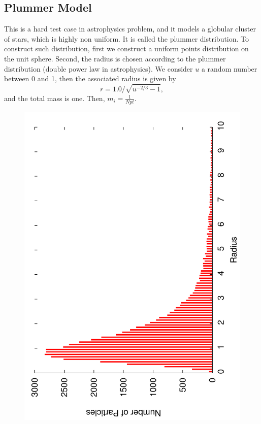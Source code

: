 \documentclass[10pt]{article}
\begin{document}
\subsection{Plummer Model}
This is a hard test case in astrophysics problem, and it models a globular cluster of stars, which is highly non uniform.  It is called   the plummer distribution. To construct such distribution, first we construct a uniform points distribution on the unit sphere. Second, the radius is chosen according to the plummer distribution (double power law in astrophysics). We consider $u$ a random number between 0 and 1, then the associated radius is given by
\begin{equation*}
r = 1.0/\sqrt{u^{-2/3}-1},
\end{equation*}
and the total mass is one. Then, $m_i = \frac{1}{Npt}$.
\begin{figure}[h]
  \centering
  \begin{minipage}{0.45\textwidth}%
    \includegraphics[scale=0.37,angle=-90]{plummerHistogramme}

\end{minipage}
\end{figure}
\end{document}
